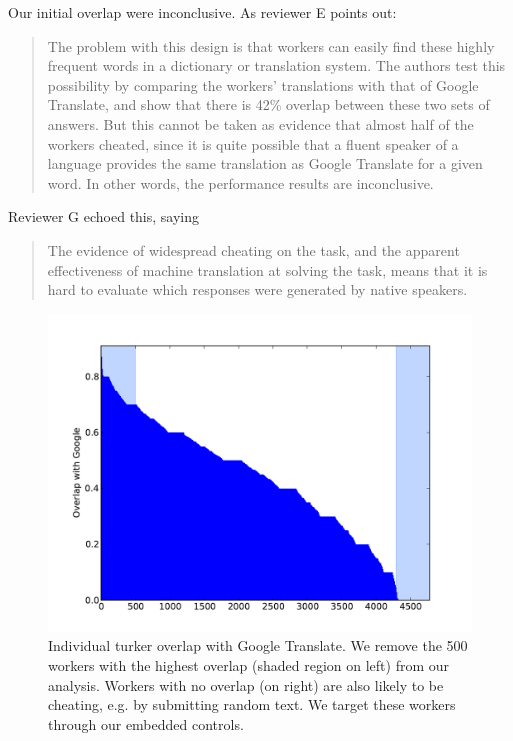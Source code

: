 \documentclass[11pt]{article}
\begin{document}
Our initial overlap were inconclusive.  As reviewer E points out: 
\begin{quote}
The problem with this design is that workers can easily find
these highly frequent words in a dictionary or translation system. The
authors test this possibility by comparing the workers' translations with
that of Google Translate, and show that there is 42\% overlap between these
two sets of answers. But this cannot be taken as evidence that almost half
of the workers cheated, since it is quite possible that a fluent speaker of
a language provides the same translation as Google Translate for a given
word. In other words, the performance results are inconclusive.
\end{quote}
Reviewer G echoed this, saying
\begin{quote}
The evidence of widespread cheating on the task, and the apparent
effectiveness of machine translation at solving the task, means that it is
hard to evaluate which responses were generated by native speakers.
\end{quote}

\begin{figure}[ht]
\includegraphics[width=\linewidth]{figures/turker-googmatch-distribution.pdf}
\caption{Individual turker overlap with Google Translate. We remove the 500 workers with the highest overlap (shaded region on left) from our analysis. Workers with no overlap (on right) are also likely to be cheating, e.g. by submitting random text. We target these workers through our embedded controls.}                
\label{dist}
\end{figure}
\end{document}
